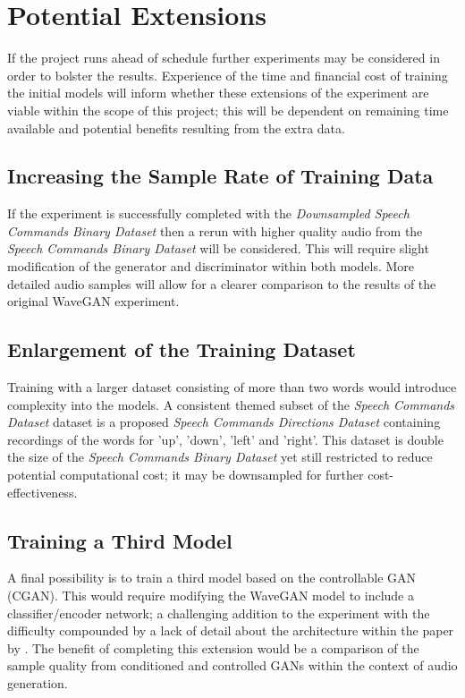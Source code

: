 \documentclass[a4paper, dvipsnames, titlepage]{article}
\begin{document}
\newpage

\section{Potential Extensions}

If the project runs ahead of schedule further experiments may be considered in order to bolster the results.
Experience of the time and financial cost of training the initial models will inform whether these extensions of the experiment are viable within the scope of this project; this will be dependent on remaining time available and potential benefits resulting from the extra data.

\subsection{Increasing the Sample Rate of Training Data}

If the experiment is successfully completed with the \textit{Downsampled Speech Commands Binary Dataset} then a rerun with higher quality audio from the \textit{Speech Commands Binary Dataset} will be considered.
This will require slight modification of the generator and discriminator within both models.
More detailed audio samples will allow for a clearer comparison to the results of the original WaveGAN experiment.

\subsection{Enlargement of the Training Dataset}

Training with a larger dataset consisting of more than two words would introduce complexity into the models.
A consistent themed subset of the \textit{Speech Commands Dataset} dataset is a proposed \textit{Speech Commands Directions Dataset} containing recordings of the words for 'up', 'down', 'left' and 'right'.
This dataset is double the size of the \textit{Speech Commands Binary Dataset} yet still restricted to reduce potential computational cost; it may be downsampled for further cost-effectiveness.

\subsection{Training a Third Model}

A final possibility is to train a third model based on the controllable GAN (CGAN).
This would require modifying the WaveGAN model to include a classifier/encoder network; a challenging addition to the experiment with the difficulty compounded by a lack of detail about the architecture within the paper by \citeauthor{2017arXiv170800598L}.
The benefit of completing this extension would be a comparison of the sample quality from conditioned and controlled GANs within the context of audio generation.
\end{document}
